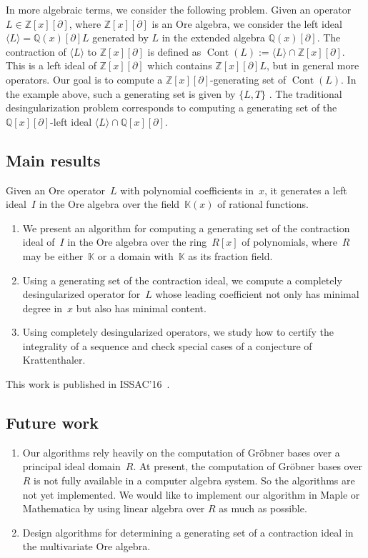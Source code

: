 \documentclass[10pt,a4paper]{article}
\newcommand{\bZ} { {\mathbb Z}}
\newcommand{\bQ}{ {\mathbb  Q}}
\newcommand{\bK}{ {\mathbb  K}}
\newcommand{\pa}{ {\partial}}
\newcommand{\cont}{\operatorname{Cont}}
\begin{document}
In more algebraic terms, we consider the following problem. Given
an operator $L\in \bZ[x][\pa]$, where $\bZ[x][\pa]$
is an Ore algebra, we consider
the left ideal $\langle L \rangle = \bQ(x)[\pa]L$ generated by $L$ in the
extended algebra $\bQ(x)[\pa]$. The contraction of $\langle L \rangle$ to
$\bZ[x][\pa]$ is defined as $\cont(L) := \langle L \rangle \cap
\bZ[x][\pa]$. This is a left ideal of $\bZ[x][\pa]$ which
contains $\bZ[x][\pa]L$, but in general more operators.
Our goal is to compute a $\bZ[x][\pa]$-generating set of $\cont(L)$.
In the example above, such a generating set is given by $\{L, T\}$ 	.
The traditional desingularization problem corresponds to computing
a generating set of the $\bQ[x][\pa]$-left ideal $\langle L \rangle \cap \bQ[x][\pa]$.


\subsection{Main results}
Given an Ore operator~$L$ with polynomial coefficients in~$x$, it generates a left ideal~$I$ in the Ore algebra
over the field~$\bK(x)$ of rational functions. 

\begin{enumerate}
 \item We present an algorithm for computing a generating set of the contraction ideal of~$I$
in the Ore algebra over the ring~$R[x]$ of polynomials, where~$R$ may be either~$\bK$ or a domain with~$\bK$ as its fraction field.
 \item Using a generating set of the contraction ideal,
we compute a completely desingularized operator for~$L$ whose leading coefficient not only
has minimal degree in~$x$ but also has minimal content.
 \item Using completely desingularized operators, we study how to certify the integrality of a sequence and 
 check special cases of a conjecture of Krattenthaler.
\end{enumerate} 

This work is published in ISSAC'16~\cite{Zhang2016}.

\subsection{Future work}

\begin{enumerate}
 \item Our algorithms rely heavily on the computation of Gr\"{o}bner bases over a principal ideal domain~$R$.
At present, the computation of Gr\"{o}bner bases over $R$ is not fully available in a computer algebra system. 
So the algorithms are not yet implemented. We would like to implement our algorithm in Maple or Mathematica 
by using linear algebra over $R$ as much as possible.
 \item Design algorithms for determining a generating set of a contraction ideal in the multivariate Ore algebra.
\end{enumerate}
\end{document}
